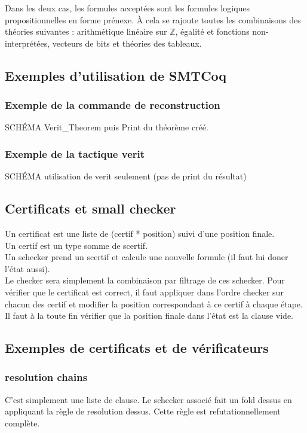 \documentclass{article}
\begin{document}
Dans les deux cas, les formules acceptées sont les formules logiques propositionnelles en forme prénexe. À cela se rajoute toutes les combinaisons des théories suivantes : arithmétique linéaire sur $\mathbb{Z}$, égalité et fonctions non-interprétées, vecteurs de bits et théories des tableaux. \\

\subsection{Exemples d'utilisation de SMTCoq}

\subsubsection{Exemple de la commande de reconstruction}

SCHÉMA Verit\_Theorem puis Print du théorème créé.

\subsubsection{Exemple de la tactique verit}

SCHÉMA utilisation de verit seulement (pas de print du résultat)


\subsection{Certificats et small checker}
Un certificat est une liste de (certif * position) suivi d'une position finale.\\
Un certif est un type somme de scertif.\\
Un schecker prend un scertif et calcule une nouvelle formule (il faut lui doner l'état aussi).\\
Le checker sera simplement la combinaison par filtrage de ces schecker.
Pour vérifier que le certificat est correct, il faut appliquer dans l'ordre checker sur chacun des certif et modifier la position correspondant à ce certif à chaque étape.\\
Il faut à la toute fin vérifier que la position finale dans l'état est la clause vide.

\subsection{Exemples de certificats et de vérificateurs}
\subsubsection{resolution chains}
C'est simplement une liste de clause.
Le schecker associé fait un fold dessus en appliquant la règle de resolution dessus. Cette règle est
refutationnellement complète.
\end{document}

